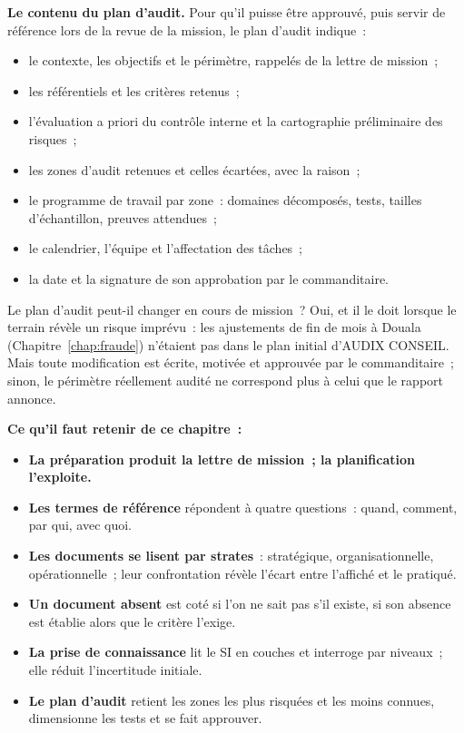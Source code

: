 \begin{boxprocedure}
\textbf{Le contenu du plan d'audit.} Pour qu'il puisse être approuvé, puis
servir de référence lors de la revue de la mission, le plan d'audit
indique~:
\begin{itemize}
    \item le contexte, les objectifs et le périmètre, rappelés de la lettre
          de mission~;
    \item les référentiels et les critères retenus~;
    \item l'évaluation a priori du contrôle interne et la cartographie
          préliminaire des risques~;
    \item les zones d'audit retenues et celles écartées, avec la raison~;
    \item le programme de travail par zone~: domaines décomposés, tests,
          tailles d'échantillon, preuves attendues~;
    \item le calendrier, l'équipe et l'affectation des tâches~;
    \item la date et la signature de son approbation par le commanditaire.
\end{itemize}
\end{boxprocedure}

\begin{boiteRemarque}{Le plan d'audit peut-il changer en cours de mission~?}
Oui, et il le doit lorsque le terrain révèle un risque imprévu~: les
ajustements de fin de mois à Douala (Chapitre~\ref{chap:fraude}) n'étaient
pas dans le plan initial d'AUDIX CONSEIL. Mais toute modification est
écrite, motivée et approuvée par le commanditaire~; sinon, le périmètre
réellement audité ne correspond plus à celui que le rapport annonce.
\end{boiteRemarque}

\separateur

\begin{boxresume}
\textbf{Ce qu'il faut retenir de ce chapitre~:}
\begin{itemize}
    \item \textbf{La préparation produit la lettre de mission~; la
          planification l'exploite.}
    \item \textbf{Les termes de référence} répondent à quatre questions~:
          quand, comment, par qui, avec quoi.
    \item \textbf{Les documents se lisent par strates}~: stratégique,
          organisationnelle, opérationnelle~; leur confrontation révèle
          l'écart entre l'affiché et le pratiqué.
    \item \textbf{Un document absent} est coté \NEK{} si l'on ne sait pas
          s'il existe, \NON{} si son absence est établie alors que le
          critère l'exige.
    \item \textbf{La prise de connaissance} lit le SI en couches et interroge
          par niveaux~; elle réduit l'incertitude initiale.
    \item \textbf{Le plan d'audit} retient les zones les plus risquées et les
          moins connues, dimensionne les tests et se fait approuver.
\end{itemize}
\end{boxresume}

